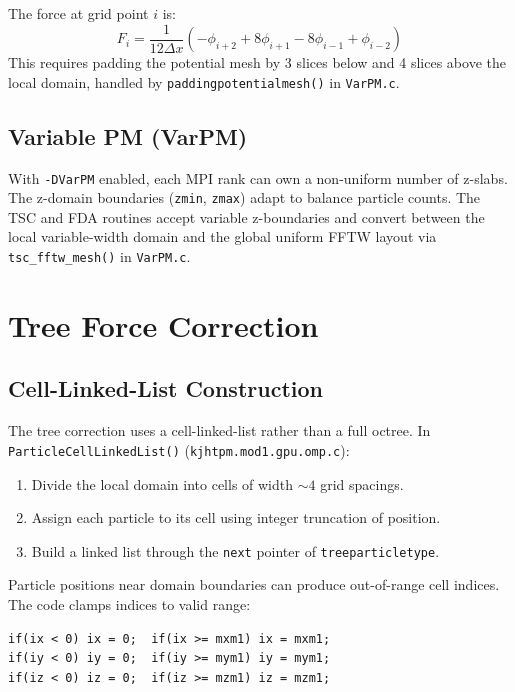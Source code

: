 \documentclass[11pt,fleqn]{book}
\newcommand{\code}[1]{\texttt{#1}}
\newcommand{\file}[1]{\texttt{#1}}
\newcommand{\flag}[1]{\texttt{-D#1}}
\begin{document}
The force at grid point $i$ is:
\begin{equation}
  F_i = \frac{1}{12\Delta x}\left(-\phi_{i+2} + 8\phi_{i+1} - 8\phi_{i-1} + \phi_{i-2}\right)
\end{equation}
This requires padding the potential mesh by 3 slices below and 4 slices above the local domain, handled by \code{paddingpotentialmesh()} in \file{VarPM.c}.

\section{Variable PM (VarPM)}

With \flag{VarPM} enabled, each MPI rank can own a non-uniform number of z-slabs.  The z-domain boundaries (\code{zmin}, \code{zmax}) adapt to balance particle counts.  The TSC and FDA routines accept variable z-boundaries and convert between the local variable-width domain and the global uniform FFTW layout via \code{tsc\_fftw\_mesh()} in \file{VarPM.c}.


\chapter{Tree Force Correction}
\label{ch:tree}

\section{Cell-Linked-List Construction}

The tree correction uses a cell-linked-list rather than a full octree.  In \code{ParticleCellLinkedList()} (\file{kjhtpm.mod1.gpu.omp.c}):

\begin{enumerate}[leftmargin=2em]
  \item Divide the local domain into cells of width $\sim 4$ grid spacings.
  \item Assign each particle to its cell using integer truncation of position.
  \item Build a linked list through the \code{next} pointer of \code{treeparticletype}.
\end{enumerate}

\begin{remark}
Particle positions near domain boundaries can produce out-of-range cell indices.  The code clamps indices to valid range:
\begin{lstlisting}[style=ccode,numbers=none]
if(ix < 0) ix = 0;  if(ix >= mxm1) ix = mxm1;
if(iy < 0) iy = 0;  if(iy >= mym1) iy = mym1;
if(iz < 0) iz = 0;  if(iz >= mzm1) iz = mzm1;
\end{lstlisting}
\end{remark}
\end{document}
